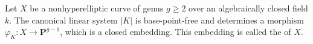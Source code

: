 Let $X$ be a nonhyperelliptic curve of genus $g \geqslant 2$ over an algebraically closed field $k$. The canonical linear system $|K|$ is base-point-free and determines a morphism $\varphi_K: X \to \mathbf{P}^{g-1}$, which is a closed embedding. This embedding is called the  of $X$.
